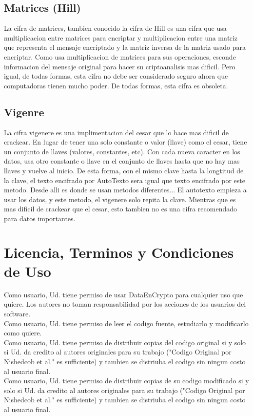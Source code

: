 \documentclass{article}
\begin{document}
		\subsection{Matrices (Hill)}
			La cifra de matrices, tambien conocido la cifra de Hill es una cifra que usa multiplicacion entre matrices para encriptar y multiplicacion entre una matriz que representa el mensaje encriptado y la matriz inversa de la matriz usado para encriptar. Como usa multiplicacion de matrices para sus operaciones, esconde informacion del mensaje original para hacer su criptoanalisis mas dificil. Pero igual, de todas formas, esta cifra no debe ser considerado seguro ahora que computadoras tienen mucho poder. De todas formas, esta cifra es obsoleta.
		\subsection{Vigenre}
			La cifra vigenere es una implimentacion del cesar que lo hace mas dificil de crackear. En lugar de tener una solo constante o valor (llave) como el cesar, tiene un conjunto de llaves (valores, constantes, etc). Con cada nueva caracter en los datos, usa otro constante o llave en el conjunto de llaves hasta que no hay mas llaves y vuelve al inicio. De esta forma, con el mismo clave hasta la longtitud de la clave, el texto encifrado por AutoTexto sera igual que texto encifrado por este metodo. Desde alli es donde se usan metodos diferentes... El autotexto empieza a usar los datos, y este metodo, el vigenere solo repita la clave. Mientras que es mas dificil de crackear que el cesar, esto tambien no es una cifra recomendado para datos importantes.
	\section{Licencia, Terminos y Condiciones de Uso}
		Como usuario, Ud. tiene permiso de usar DataEnCrypto para cualquier uso que quiere. Los autores no toman responsabilidad por los acciones de los usuarios del software.
		\\
		Como usuario, Ud. tiene permiso de leer el codigo fuente, estudiarlo y modificarlo como quiere.
		\\
		Como usuario, Ud. tiene permiso de distribuir copias del codigo original si y solo si Ud. da credito al autores originales para su trabajo ("Codigo Original por Nishedcob et al." es sufficiente) y tambien se distriuba el codigo sin ningun costo al usuario final.
		\\
		Como usuario, Ud. tiene permiso de distribuir copias de su codigo modificado si y solo si Ud. da credito al autores originales para su trabajo ("Codigo Original por Nishedcob et al." es sufficiente) y tambien se distriuba el codigo sin ningun costo al usuario final.
\end{document}
